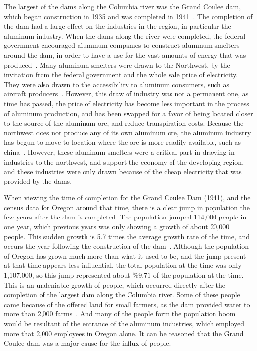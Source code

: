 \documentclass[12pt,twoside]{article}
\begin{document}
The largest of the dams along the Columbia river was the Grand Coulee dam, which began construction in 1935 and was completed in 1941~\cite{GCD}. The completion of the dam had a large effect on the industries in the region, in particular the aluminum industry. When the dams along the river were completed, the federal government encouraged aluminum companies to construct aluminum smelters around the dam, in order to have a use for the vast amounts of energy that was produced~\cite{OAI}. Many aluminum smelters were drawn to the Northwest, by the invitation from the federal government and the whole sale price of electricity. They were also drawn to the accessibility to aluminum consumers, such as aircraft producers~\cite{OAH}. However, this draw of industry was not a permanent one, as time has passed, the price of electricity has become less important in the process of aluminum production, and has been swapped for a favor of being located closer to the source of the aluminum ore, and reduce transpiration costs. Because the northwest does not produce any of its own aluminum ore, the aluminum industry has begun to move to location where the ore is more readily available, such as china~\cite{OAH}. However, these aluminum smelters were a critical part in drawing in industries to the northwest, and support the economy of the developing region, and these industries were only drawn because of the cheap electricity that was provided by the dams.
\par
When viewing the time of completion for the Grand Coulee Dam (1941), and the census data for Oregon around that time, there is a clear jump in population the few years after the dam is completed. The population jumped 114,000 people in one year, which previous years was only showing a growth of about 20,000 people. This sudden growth is 5.7 times the average growth rate of the time, and occurs the year following the construction of the dam~\cite{O_POP}. Although the population of Oregon has grown much more than what it used to be, and the jump present at that time appears less influential, the total population at the time was only 1,107,000, so this jump represented about $\%9.71$ of the population at the time. This is an undeniable growth of people, which occurred directly after the completion of the largest dam along the Columbia river. Some of these people came because of the offered land for small farmers, as the dam provided water to more than 2,000 farms~\cite{GC}. And many of the people form the population boom would be resultant of the entrance of the aluminum industries, which employed more that 2,000 employees in Oregon alone. It can be reasoned that the Grand Coulee dam was a major cause for the influx of people.
\end{document}
